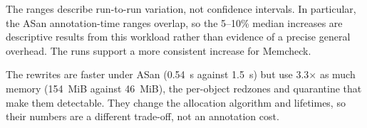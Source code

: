 The ranges describe run-to-run variation, not confidence intervals. In particular, the ASan annotation-time ranges overlap, so the 5--10\% median increases are descriptive results from this workload rather than evidence of a precise general overhead. The runs support a more consistent increase for Memcheck.

The rewrites are faster under ASan (0.54~s against 1.5~s) but use 3.3$\times$ as much memory (154~MiB against 46~MiB), the per-object redzones and quarantine that make them detectable. They change the allocation algorithm and lifetimes, so their numbers are a different trade-off, not an annotation cost.
